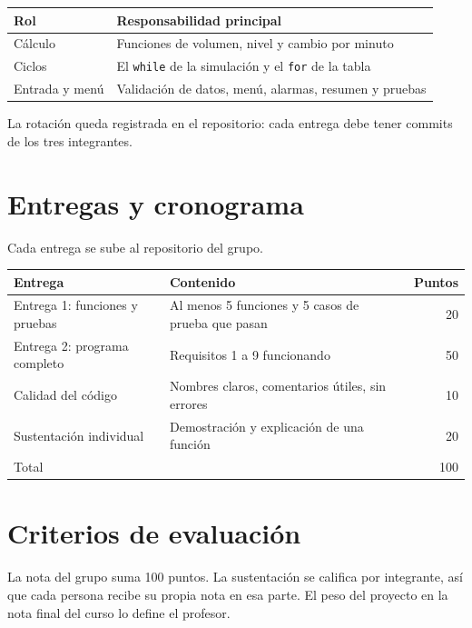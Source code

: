 \documentclass[doc]{apa6}
\begin{document}
\begin{table}[h]
\centering
\begin{tabularx}{\textwidth}{@{}>{\raggedright\arraybackslash}p{}X@{}}
\toprule
Rol & Responsabilidad principal \\
\midrule
Cálculo & Funciones de volumen, nivel y cambio por minuto \\
Ciclos & El \texttt{while} de la simulación y el \texttt{for} de la tabla \\
Entrada y menú & Validación de datos, menú, alarmas, resumen y pruebas \\
\bottomrule
\end{tabularx}
\end{table}

La rotación queda registrada en el repositorio: cada entrega debe tener commits de los tres integrantes.

\section*{Entregas y cronograma}
Cada entrega se sube al repositorio del grupo. 

\begin{table}[h]
\centering
\begin{tabularx}{\textwidth}{@{}>{\raggedright\arraybackslash}p{}Xr@{}}
\toprule
Entrega & Contenido & Puntos \\
\midrule
Entrega 1: funciones y pruebas & Al menos 5 funciones y 5 casos de prueba que pasan & 20 \\
Entrega 2: programa completo & Requisitos 1 a 9 funcionando & 50 \\
Calidad del código & Nombres claros, comentarios útiles, sin errores & 10 \\
Sustentación individual & Demostración y explicación de una función & 20 \\
\midrule
Total & & 100 \\
\bottomrule
\end{tabularx}
\end{table}

\section*{Criterios de evaluación}
La nota del grupo suma 100 puntos. La sustentación se califica por integrante, así que cada persona recibe su propia nota en esa parte. El peso del proyecto en la nota final del curso lo define el profesor.
\end{document}
